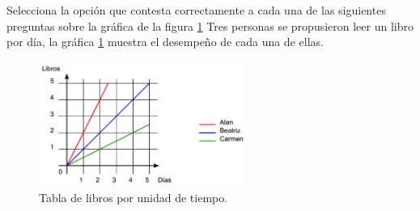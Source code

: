 Selecciona la opci\'on que contesta correctamente
a cada una de las siguientes preguntas sobre la gr\'afica de la figura \ref{fig:SINMAT1_U3_AC74_IMG1}
Tres personas se propusieron leer un libro por día, la gráfica \ref{fig:SINMAT1_U3_AC74_IMG1} muestra el desempeño de cada una de ellas.
\begin{figure}[H]
    \centering
    \includegraphics[width=0.6\textwidth]{../images/SINMAT1_U3_AC74_IMG1}
    \caption{Tabla de libros por unidad de tiempo.}
    \label{fig:SINMAT1_U3_AC74_IMG1}
\end{figure}
\begin{parts}
    
    
    
    
    
    
    
\end{parts}